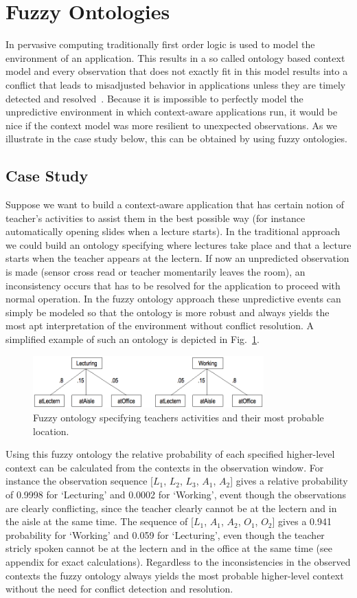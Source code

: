 \documentclass[journal]{vgtc}                %
\begin{document}
\section{Fuzzy Ontologies}
In pervasive computing traditionally first order logic is used to model the environment of an application. This results in a so called ontology based context model and every observation that does not exactly fit in this model results into a conflict that leads to misadjusted behavior in applications unless they are timely detected and resolved~\cite{xu:2010:PCC}. Because it is impossible to perfectly model the unpredictive environment in which context-aware applications run, it would be nice if the context model was more resilient to unexpected observations. As we illustrate in the case study below, this can be obtained by using fuzzy ontologies.
\subsection{Case Study}
Suppose we want to build a context-aware application that has certain notion of teacher's activities to assist them in the best possible way (for instance automatically opening slides when a lecture starts). In the traditional approach we could build an ontology specifying where lectures take place and that a lecture starts when the teacher appears at the lectern. If now an unpredicted observation is made (sensor cross read or teacher momentarily leaves the room), an inconsistency occurs that has to be resolved for the application to proceed with normal operation. In the fuzzy ontology approach these unpredictive events can simply be modeled so that the ontology is more robust and always yields the most apt interpretation of the environment without conflict resolution. A simplified example of such an ontology is depicted in Fig.~\ref{fig:fuzzy}.
\begin{figure}[htb]
  \centering
  \includegraphics[width=3.5in]{fuzzy}
  \caption{Fuzzy ontology specifying teachers activities and their most probable location.}
  \label{fig:fuzzy}
\end{figure}
Using this fuzzy ontology the relative probability of each specified higher-level context can be calculated from the contexts in the observation window. For instance the observation sequence [$L_1$, $L_2$, $L_3$, $A_1$, $A_2$] gives a relative probability of 0.9998 for `Lecturing' and 0.0002 for `Working', event though the observations are clearly conflicting, since the teacher clearly cannot be at the lectern and in the aisle at the same time. The sequence of [$L_1$, $A_1$, $A_2$, $O_1$, $O_2$] gives a 0.941 probability for `Working' and 0.059 for `Lecturing', even though the teacher stricly spoken cannot be at the lectern and in the office at the same time (see appendix for exact calculations). Regardless to the inconsistencies in the observed contexts the fuzzy ontology always yields the most probable higher-level context without the need for conflict detection and resolution.
\end{document}

